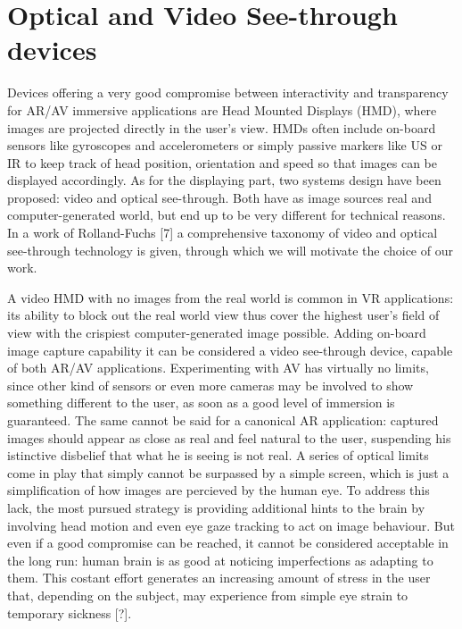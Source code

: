 \section{Optical and Video See-through devices} %
Devices offering a very good compromise between interactivity and transparency for AR/AV immersive applications are Head Mounted Displays (HMD), where images are projected directly in the user’s view. HMDs often include on-board sensors like gyroscopes and accelerometers or simply passive markers like US or IR to keep track of head position, orientation and speed so that images can be displayed accordingly. As for the displaying part, two systems design have been proposed: video and optical see-through. Both have as image sources real and computer-generated world, but end up to be very different for technical reasons. In a work of Rolland-Fuchs [7] a comprehensive taxonomy of video and optical see-through technology is given, through which we will motivate the choice of our work.

A video HMD with no images from the real world is common in VR applications: its ability to block out the real world view thus cover the highest user’s field of view with the crispiest computer-generated image possible. Adding on-board image capture capability it can be considered a video see-through device, capable of both AR/AV applications. Experimenting with AV has virtually no limits, since other kind of sensors or even more cameras may be involved to show something different to the user, as soon as a good level of immersion is guaranteed. The same cannot be said for a canonical AR application: captured images should appear as close as real and feel natural to the user, suspending his istinctive disbelief that what he is seeing is not real. A series of optical limits come in play that simply cannot be surpassed by a simple screen, which is just a simplification of how images are percieved by the human eye. To address this lack, the most pursued strategy is providing additional hints to the brain by involving head motion and even eye gaze tracking to act on image behaviour. But even if a good compromise can be reached, it cannot be considered acceptable in the long run: human brain is as good at noticing imperfections as adapting to them. This costant effort generates an increasing amount of stress in the user that, depending on the subject, may experience from simple eye strain to temporary sickness [?].

